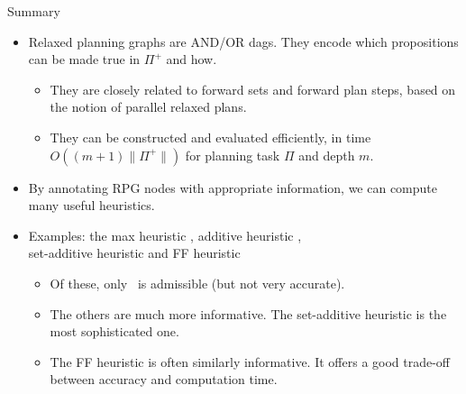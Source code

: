 \documentclass{gkibeamer}
\begin{document}
\begin{frame}{Summary}
  \begin{itemize}
  \item \alert{Relaxed planning graphs} are \alert{AND/OR dags}. They
    encode which propositions can be made true in $\Pi^+$ and how.
    \begin{itemize}
    \item They are closely related to \alert{forward sets} and
      \alert{forward plan steps}, based on the notion of
      \alert{parallel relaxed plans}.
    \item They can be \alert{constructed and evaluated efficiently},
      in time $O((m+1)\|\Pi^+\|)$ for planning task $\Pi$ and depth
      $m$.
    \end{itemize}
  \item By annotating RPG nodes with appropriate information, we can
    compute many useful heuristics.
  \item Examples: the \alert{max} heuristic \alert{\hmax},
    \alert{additive} heuristic \alert{\hadd}, \\ \alert{set-additive}
    heuristic \alert{\hsa} and \alert{FF} heuristic \alert{\hff}
    \begin{itemize}
    \item Of these, only \hmax\ is admissible (but not very accurate).
    \item The others are much more informative. The set-additive
      heuristic is the most sophisticated one.
    \item The FF heuristic is often similarly informative. It offers a
      good trade-off between accuracy and computation time.
    \end{itemize}
  \end{itemize}
\end{frame}
\end{document}
